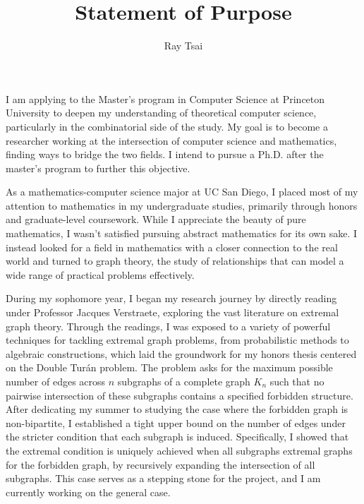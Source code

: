 \documentclass[12pt]{article}
\title{Statement of Purpose}
\author{Ray Tsai}
\date{}
\begin{document}
\maketitle

\vspace{-0.25in}

I am applying to the Master's program in Computer Science at Princeton University to deepen my
understanding of theoretical computer science, particularly in the combinatorial side of the study.
My goal is to become a researcher working at the intersection of computer science and mathematics,
finding ways to bridge the two fields. I intend to pursue a Ph.D. after the master's program to
further this objective.

As a mathematics-computer science major at UC San Diego, I placed most of my attention to
mathematics in my undergraduate studies, primarily through honors and graduate-level coursework.
While I appreciate the beauty of pure mathematics, I wasn't satisfied pursuing abstract mathematics
for its own sake. I instead looked for a field in mathematics with a closer connection to the real
world and turned to graph theory, the study of relationships that can model a wide range of
practical problems effectively.

During my sophomore year, I began my research journey by directly reading under Professor Jacques
Verstraete, exploring the vast literature on extremal graph theory. Through the readings, I was
exposed to a variety of powerful techniques for tackling extremal graph problems, from probabilistic
methods to algebraic constructions, which laid the groundwork for my honors thesis centered on the
Double Turán problem. The problem asks for the maximum possible number of edges across $n$ subgraphs
of a complete graph $K_n$ such that no pairwise intersection of these subgraphs contains a specified
forbidden structure. After dedicating my summer to studying the case where the forbidden graph is
non-bipartite, I established a tight upper bound on the number of edges under the stricter condition
that each subgraph is induced. Specifically, I showed that the extremal condition is uniquely
achieved when all subgraphs extremal graphs for the forbidden graph, by recursively expanding the
intersection of all subgraphs. This case serves as a stepping stone for the project, and I am
currently working on the general case. 
\end{document}
